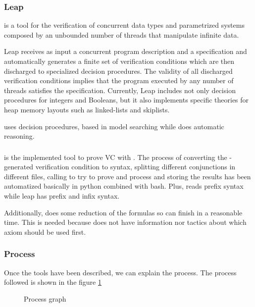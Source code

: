 \subsubsection{Leap}

\leap is a tool for the verification of concurrent data types and parametrized systems composed by an unbounded number of threads that manipulate infinite data.

Leap receives as input a concurrent program description and a specification and automatically generates a finite set of verification conditions which are then discharged to specialized decision procedures. 
%
The validity of all discharged verification conditions implies that the program executed by any number of threads satisfies the specification. 
%
Currently, Leap includes not only decision procedures for integers and Booleans, but it also implements specific theories for heap memory layouts such as linked-lists and skiplists.

\leap uses decision procedures, based in model searching while \spass does automatic reasoning. 



\subsubsection{\gandalf}

\gandalf is the implemented tool to prove \gls{VC} with \spass. 
%
The process of converting the \leap-generated verification condition to \spass syntax, splitting different conjunctions in different files, calling \spass to try to prove and process and storing the results has been automatized basically in python combined with bash.
Plus, \spass reads prefix syntax while leap has prefix and infix syntax.

Additionally, \gandalf does some reduction of the formulas so \spass can finish in a reasonable time.
%
This is needed because \spass does not have information nor tactics about which axiom should be used first.



\subsubsection{Process}

\label{ProcessDescription}
Once the tools have been described, we can explain the process. 
%
The process followed is shown in the figure \ref{fig:process}


\begin{figure}

\caption{Process graph}
\label{fig:process}
\end{figure}


